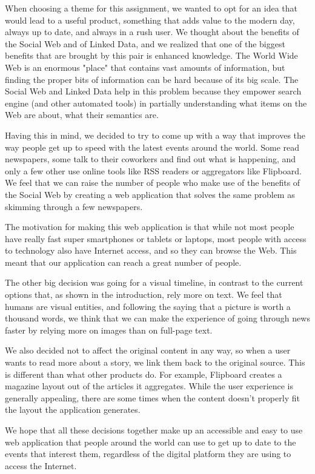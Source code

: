 \documentclass{acm_proc_10ptArticle-sp}
\begin{document}
When choosing a theme for this assignment, we wanted to opt for an idea that would lead to a useful product, something that adds value to the modern day, always up to date, and always in a rush user. We thought about the benefits of the Social Web and of Linked Data, and we realized that one of the biggest benefits that are brought by this pair is enhanced knowledge. The World Wide Web is an enormous "place" that contains vast amounts of information, but finding the proper bits of information can be hard because of its big scale. The Social Web and Linked Data help in this problem because they empower search engine (and other automated tools) in partially understanding what items on the Web are about, what their semantics are.

Having this in mind, we decided to try to come up with a way that improves the way people get up to speed with the latest events around the world. Some read newspapers, some talk to their coworkers and find out what is happening, and only a few other use online tools like RSS readers or aggregators like Flipboard. We feel that we can raise the number of people who make use of the benefits of the Social Web by creating a web application that solves the same problem as skimming through a few newspapers.

The motivation for making this web application is that while not most people have really fast super smartphones or tablets or laptops, most people with access to technology also have Internet access, and so they can browse the Web. This meant that our application can reach a great number of people.

The other big decision was going for a visual timeline, in contrast to the current options that, as shown in the introduction, rely more on text. We feel that humans are visual entities, and following the saying that a picture is worth a thousand words, we think that we can make the experience of going through news faster by relying more on images than on full-page text.

We also decided not to affect the original content in any way, so when a user wants to read more about a story, we link them back to the original source. This is different than what other products do. For example, Flipboard creates a magazine layout out of the articles it aggregates. While the user experience is generally appealing, there are some times when the content doesn't properly fit the layout the application generates.

We hope that all these decisions together make up an accessible and easy to use web application that people around the world can use to get up to date to the events that interest them, regardless of the digital platform they are using to access the Internet.
\end{document}
